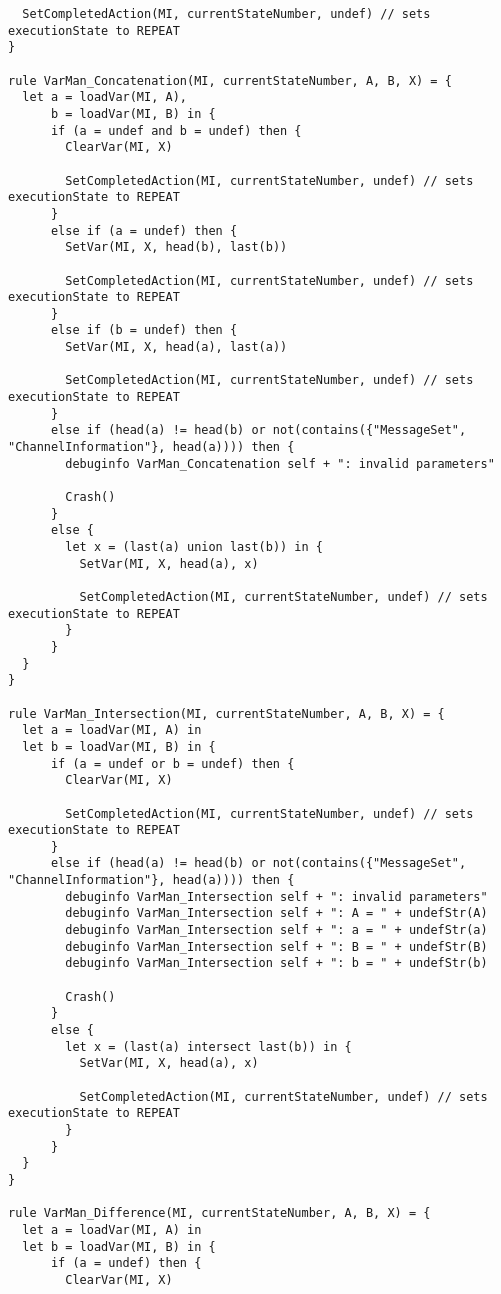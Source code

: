 \begin{listing}[H]
\begin{verbatim}
  SetCompletedAction(MI, currentStateNumber, undef) // sets executionState to REPEAT
}

rule VarMan_Concatenation(MI, currentStateNumber, A, B, X) = {
  let a = loadVar(MI, A),
      b = loadVar(MI, B) in {
      if (a = undef and b = undef) then {
        ClearVar(MI, X)

        SetCompletedAction(MI, currentStateNumber, undef) // sets executionState to REPEAT
      }
      else if (a = undef) then {
        SetVar(MI, X, head(b), last(b))

        SetCompletedAction(MI, currentStateNumber, undef) // sets executionState to REPEAT
      }
      else if (b = undef) then {
        SetVar(MI, X, head(a), last(a))

        SetCompletedAction(MI, currentStateNumber, undef) // sets executionState to REPEAT
      }
      else if (head(a) != head(b) or not(contains({"MessageSet", "ChannelInformation"}, head(a)))) then {
        debuginfo VarMan_Concatenation self + ": invalid parameters"

        Crash()
      }
      else {
        let x = (last(a) union last(b)) in {
          SetVar(MI, X, head(a), x)

          SetCompletedAction(MI, currentStateNumber, undef) // sets executionState to REPEAT
        }
      }
  }
}

rule VarMan_Intersection(MI, currentStateNumber, A, B, X) = {
  let a = loadVar(MI, A) in
  let b = loadVar(MI, B) in {
      if (a = undef or b = undef) then {
        ClearVar(MI, X)

        SetCompletedAction(MI, currentStateNumber, undef) // sets executionState to REPEAT
      }
      else if (head(a) != head(b) or not(contains({"MessageSet", "ChannelInformation"}, head(a)))) then {
        debuginfo VarMan_Intersection self + ": invalid parameters"
        debuginfo VarMan_Intersection self + ": A = " + undefStr(A)
        debuginfo VarMan_Intersection self + ": a = " + undefStr(a)
        debuginfo VarMan_Intersection self + ": B = " + undefStr(B)
        debuginfo VarMan_Intersection self + ": b = " + undefStr(b)

        Crash()
      }
      else {
        let x = (last(a) intersect last(b)) in {
          SetVar(MI, X, head(a), x)

          SetCompletedAction(MI, currentStateNumber, undef) // sets executionState to REPEAT
        }
      }
  }
}

rule VarMan_Difference(MI, currentStateNumber, A, B, X) = {
  let a = loadVar(MI, A) in
  let b = loadVar(MI, B) in {
      if (a = undef) then {
        ClearVar(MI, X)


\end{verbatim}
\end{listing}
